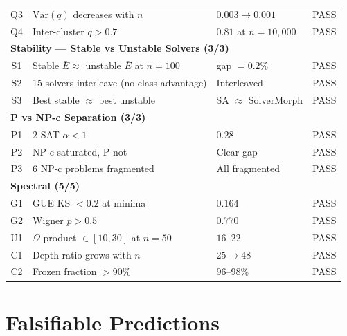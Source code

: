 \documentclass[11pt,a4paper]{article}
\theoremstyle{plain}
\theoremstyle{definition}
\theoremstyle{remark}
\begin{document}
\begin{center}
\begin{tabular}{clll}
Q3 & $\text{Var}(q)$ decreases with $n$ & $0.003 \to 0.001$ & \textcolor{proved}{PASS} \\
Q4 & Inter-cluster $q > 0.7$ & $0.81$ at $n = 10{,}000$ & \textcolor{proved}{PASS} \\
\midrule
\multicolumn{4}{l}{\textbf{Stability --- Stable vs Unstable Solvers (3/3)}} \\
S1 & Stable $\bar{E} \approx$ unstable $\bar{E}$ at $n=100$ & gap $= 0.2\%$ & \textcolor{proved}{PASS} \\
S2 & 15 solvers interleave (no class advantage) & Interleaved & \textcolor{proved}{PASS} \\
S3 & Best stable $\approx$ best unstable & SA $\approx$ SolverMorph & \textcolor{proved}{PASS} \\
\midrule
\multicolumn{4}{l}{\textbf{P vs NP-c Separation (3/3)}} \\
P1 & 2-SAT $\alpha < 1$ & $0.28$ & \textcolor{proved}{PASS} \\
P2 & NP-c saturated, P not & Clear gap & \textcolor{proved}{PASS} \\
P3 & 6 NP-c problems fragmented & All fragmented & \textcolor{proved}{PASS} \\
\midrule
\multicolumn{4}{l}{\textbf{Spectral (5/5)}} \\
G1 & GUE KS $< 0.2$ at minima & $0.164$ & \textcolor{proved}{PASS} \\
G2 & Wigner $p > 0.5$ & $0.770$ & \textcolor{proved}{PASS} \\
U1 & $\Omega$-product $\in [10,30]$ at $n=50$ & $16$--$22$ & \textcolor{proved}{PASS} \\
C1 & Depth ratio grows with $n$ & $25 \to 48$ & \textcolor{proved}{PASS} \\
C2 & Frozen fraction $> 90\%$ & $96$--$98\%$ & \textcolor{proved}{PASS} \\
\bottomrule
\end{tabular}
\end{center}

\section{Falsifiable Predictions}
\end{document}
